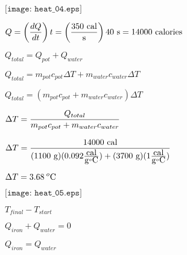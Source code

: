\documentclass[12pt,a4paper,margin=2cm]{book}
\def\lthtmlcheckvsize{\ifdim\ht\sizebox<\vsize 
  \ifdim\wd\sizebox<\hsize\expandafter\hfill\fi \expandafter\vfill
  \else\expandafter\vss\fi}%
\begin{document}
{\newpage\clearpage
{}%
$\displaystyle \texttt{[image: heat\_04.eps]}$%
\lthtmlindisplaymathZ
\lthtmlcheckvsize\clearpage}

{\newpage\clearpage
{}%
$\displaystyle Q = \left({dQ \over dt}\right) t = \left({350 \hbox{ cal} \over \hbox{s}}\right) 40 \hbox{ s} = 14000 \hbox{ calories}$%
\lthtmlindisplaymathZ
\lthtmlcheckvsize\clearpage}

{\newpage\clearpage
{}%
$\displaystyle Q_{total} = Q_{pot} + Q_{water}$%
\lthtmlindisplaymathZ
\lthtmlcheckvsize\clearpage}

{\newpage\clearpage
{}%
$\displaystyle Q_{total} = m_{pot}c_{pot} \Delta T + m_{water}c_{water} \Delta T$%
\lthtmlindisplaymathZ
\lthtmlcheckvsize\clearpage}

{\newpage\clearpage
{}%
$\displaystyle Q_{total} = (m_{pot}c_{pot} + m_{water}c_{water}) \Delta T$%
\lthtmlindisplaymathZ
\lthtmlcheckvsize\clearpage}

{\newpage\clearpage
{}%
$\displaystyle \Delta T = {Q_{total} \over {m_{pot}c_{pot} + m_{water}c_{water}}}$%
\lthtmlindisplaymathZ
\lthtmlcheckvsize\clearpage}

{\newpage\clearpage
{}%
$\displaystyle \Delta T = {14000 \hbox{ cal} \over {(1100 \hbox{ g})(0.092 {\hbox{cal} \over \hbox{g}^o\hbox{C}}) + (3700 \hbox{ g})(1 {\hbox{cal} \over \hbox{g}^o\hbox{C}})}}$%
\lthtmlindisplaymathZ
\lthtmlcheckvsize\clearpage}

{\newpage\clearpage
{}%
$\displaystyle \Delta T = 3.68 \> ^o\hbox{C}$%
\lthtmlindisplaymathZ
\lthtmlcheckvsize\clearpage}

{\newpage\clearpage
{}%
$\displaystyle \texttt{[image: heat\_05.eps]}$%
\lthtmlindisplaymathZ
\lthtmlcheckvsize\clearpage}

{\newpage\clearpage
{}%
$ T_{final} - T_{start}$%
\lthtmlindisplaymathZ
\lthtmlcheckvsize\clearpage}

{\newpage\clearpage
{}%
$ Q_{iron} + Q_{water} = 0$%
\lthtmlindisplaymathZ
\lthtmlcheckvsize\clearpage}

{\newpage\clearpage
{}%
$\displaystyle Q_{iron} = Q_{water}$%
\lthtmlindisplaymathZ
\lthtmlcheckvsize\clearpage}
\end{document}

